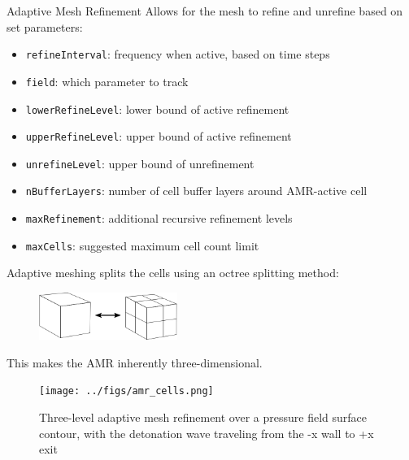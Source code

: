 \begin{frame}[allowframebreaks]{Adaptive Mesh Refinement}
Allows for the mesh to refine and unrefine based on set parameters:
\begin{itemize}
\item \texttt{refineInterval}: frequency when active, based on time steps
\item \texttt{field}: which parameter to track
\item \texttt{lowerRefineLevel}: lower bound of active refinement 
\item \texttt{upperRefineLevel}: upper bound of active refinement
\item \texttt{unrefineLevel}: upper bound of unrefinement
\item \texttt{nBufferLayers}: number of cell buffer layers around AMR-active cell
\item \texttt{maxRefinement}: additional recursive refinement levels
\item \texttt{maxCells}: suggested maximum cell count limit
\end{itemize}


Adaptive meshing splits the cells using an octree splitting method:
\begin{figure}[]
\centering
\includegraphics[width=0.4\textwidth]{../figs/amr_example.png}
\end{figure}%
This makes the AMR inherently three-dimensional. 

\begin{figure}
\centering
\texttt{[image: ../figs/amr\_cells.png]}
\caption{Three-level adaptive mesh refinement over a pressure field surface contour, with the detonation wave traveling from the -x wall to +x exit}
\end{figure}
\end{frame}

